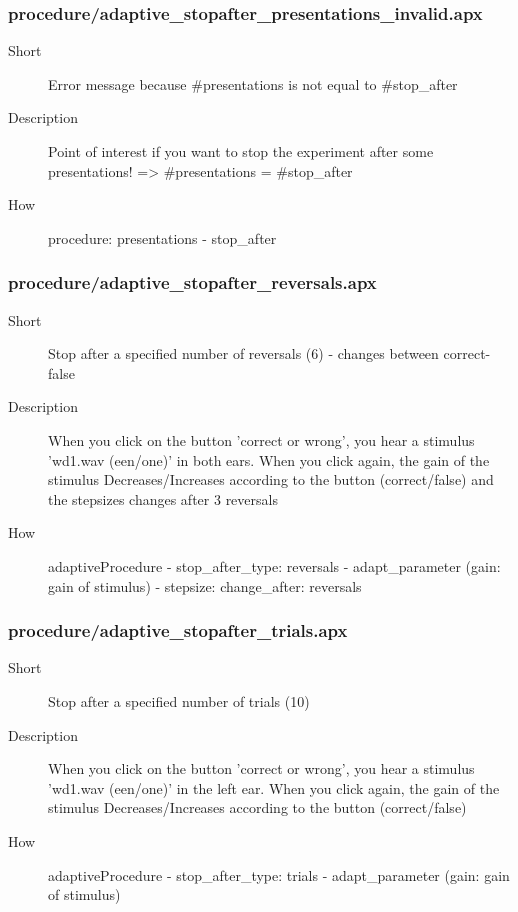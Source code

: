 \subsubsection{procedure/adaptive\_stopafter\_presentations\_invalid.apx}
\begin{description}
\item[Short] 
 Error message because \#presentations is not equal to \#stop\_after
\item[Description] 
 Point of interest if you want to stop the experiment after some presentations! =\textgreater{} \#presentations = \#stop\_after
\item[How] 
 procedure: presentations - stop\_after
\end{description}

\subsubsection{procedure/adaptive\_stopafter\_reversals.apx}
\begin{description}
\item[Short] 
 Stop after a specified number of reversals (6) - changes between correct-false
\item[Description] 
 When you click on the button 'correct or wrong', you hear a stimulus 'wd1.wav (een/one)' in both ears. When you click again, the gain of the stimulus Decreases/Increases according to the button (correct/false) and the stepsizes changes after 3 reversals
\item[How] 
 adaptiveProcedure - stop\_after\_type: reversals - adapt\_parameter (gain: gain of stimulus) - stepsize: change\_after: reversals
\end{description}

\subsubsection{procedure/adaptive\_stopafter\_trials.apx}
\begin{description}
\item[Short] 
 Stop after a specified number of trials (10)
\item[Description] 
 When you click on the button 'correct or wrong', you hear a stimulus 'wd1.wav (een/one)' in the left ear. When you click again, the gain of the stimulus Decreases/Increases according to the button (correct/false)
\item[How] 
 adaptiveProcedure - stop\_after\_type: trials - adapt\_parameter (gain: gain of stimulus)
\end{description}

